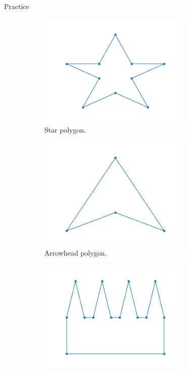 \documentclass{beamer}
\begin{document}
\begin{frame}{Practice}
	\begin{figure}[h!]
		\centering
		\begin{subfigure}{0.45\textwidth}
			\centering
			\includegraphics[width = 0.8\textwidth]{Images/pentagram.png}
			\caption{Star polygon.}
			\label{fig:star}
		\end{subfigure}
		\begin{subfigure}{0.45\textwidth}
			\centering
			\includegraphics[width = 0.8\textwidth]{Images/concave_triangle.png}
			\caption{Arrowhead polygon.}
			\label{fig:concave}
		\end{subfigure}
		\begin{subfigure}{0.45\textwidth}
			\centering
			\includegraphics[width = 0.8\textwidth]{Images/comb.png}

\end{subfigure}
\end{figure}
\end{frame}
\end{document}
